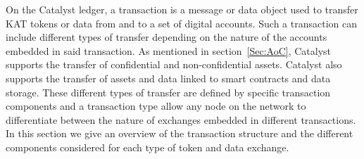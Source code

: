 On the Catalyst ledger, a transaction is a message or data object used to transfer KAT tokens or data from and to a set of digital accounts. Such a transaction can include different types of transfer depending on the nature of the accounts embedded in said transaction. As mentioned in section~\ref{Sec:AoC}, Catalyst supports the transfer of confidential and non-confidential assets. Catalyst also supports the transfer of assets and data linked to smart contracts and data storage. These different types of transfer are defined by specific transaction components and a transaction type allow any node on the network to differentiate between the nature of exchanges embedded in different transactions. In this section we give an overview of the transaction structure and the different components considered for each type of token and data exchange.